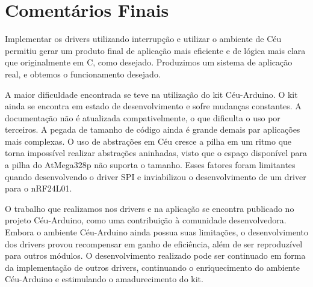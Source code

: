 \documentclass[11pt]{article}
\begin{document}
\section{Comentários Finais}
\tab Implementar os drivers utilizando interrupção e utilizar o ambiente de Céu permitiu gerar um produto final de aplicação mais eficiente e de lógica mais clara que originalmente em C, como desejado. Produzimos um sistema de aplicação real, e obtemos o funcionamento desejado.
\par A maior dificuldade encontrada se teve na utilização do kit Céu-Arduino. O kit ainda se encontra em estado de desenvolvimento e sofre mudanças constantes. A documentação não é atualizada compativelmente, o que dificulta o uso por terceiros. A pegada de tamanho de código ainda é grande demais par aplicações mais complexas. O uso de abstrações em Céu cresce a pilha em um ritmo que torna impossível realizar abstrações aninhadas, visto que o espaço disponível para a pilha do AtMega328p não suporta o tamanho. Esses fatores foram limitantes quando desenvolvendo o driver SPI e inviabilizou o desenvolvimento de um driver para o nRF24L01.
\par O trabalho que realizamos nos drivers e na aplicação se encontra publicado no projeto Céu-Arduino\cite{githubceuarduino}, como uma contribuição à comunidade desenvolvedora. Embora o ambiente Céu-Arduino ainda possua suas limitações, o desenvolvimento dos drivers provou recompensar em ganho de eficiência, além de ser reproduzível para outros módulos. O desenvolvimento realizado pode ser continuado em forma da implementação de outros drivers, continuando o enriquecimento do ambiente Céu-Arduino e estimulando o amadurecimento do kit.

\newpage

\printbibliography
\end{document}
